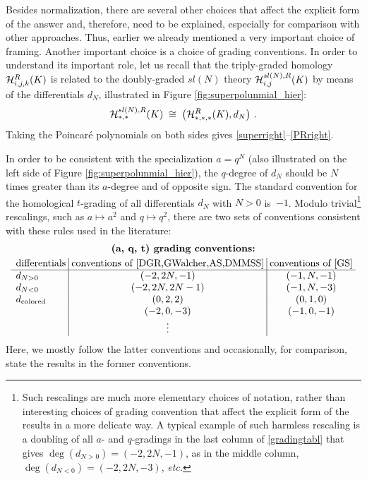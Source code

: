 \documentclass[hyper,letterpaper]{JHEP3}
\newcommand{\be}{\begin{equation}}
\newcommand{\ee}{\end{equation}}
\newcommand{\cH}{{\cal H }}
\begin{document}
Besides normalization, there are several other choices that affect the explicit form
of the answer and, therefore, need to be explained, especially for comparison with other approaches.
Thus, earlier we already mentioned a very important choice of framing.
Another important choice is a choice of grading conventions.
In order to understand its important role,
let us recall that the triply-graded homology $\cH^R_{i,j,k} (K)$
is related to the doubly-graded $sl(N)$ theory $\cH^{sl(N), R}_{i,j} (K)$
by means of the differentials $d_N$, illustrated in Figure \ref{fig:superpolunmial_hier}:
\be
\cH^{sl(N), R}_{*,*} (K) \; \cong \; \left( \cH^R_{*,*,*} (K) , d_N \right) \,.
\label{specN}
\ee
Taking the Poincar\'e polynomials on both sides gives \eqref{superright}--\eqref{PRright}.

In order to be consistent with the specialization $a=q^N$ (also illustrated on the left side of Figure \ref{fig:superpolunmial_hier}),
the $q$-degree of $d_N$ should be $N$ times greater than its $a$-degree and of opposite sign.
The standard convention for the homological $t$-grading of all differentials $d_N$ with $N>0$ is~$-1$.
Modulo trivial\footnote{Such rescalings are much more elementary choices of notation,
rather than interesting choices of grading convention that affect the explicit form of the results in a more delicate way.
A typical example of such harmless rescaling is a doubling of all $a$- and $q$-gradings
in the last column of \eqref{gradingtabl} that gives $\deg (d_{N>0}) = (-2,2N,-1)$,
as in the middle column, $\deg (d_{N<0}) = (-2,2N,-3)$, {\it etc.}}
rescalings, such as $a \mapsto a^2$ and $q \mapsto q^2$,
there are two sets of conventions consistent with these rules used in the literature:
\be
\begin{array}{l@{\;}|@{\;}c@{\;}|@{\;}c@{\;}c}
\multicolumn{3}{c}{\textbf{(a, q, t) grading conventions:}} \\[.1cm]
\text{differentials} & \text{conventions of } \cite{DGR,GWalcher,AS,DMMSS} & \text{conventions of } \cite{GS} \\\hline
d_{N>0} & (-2,2N,-1) & (-1,N,-1) \\
d_{N<0} & (-2,2N,2N-1) & (-1,N,-3) \\
d_{\text{colored}} & (0,2,2) & (0,1,0) \\
& (-2,0,-3) & (-1,0,-1) \\
& \vdots &
\end{array}
\label{gradingtabl}
\ee
Here, we mostly follow the latter conventions and occasionally, for comparison, state the results in the former conventions.
\end{document}
